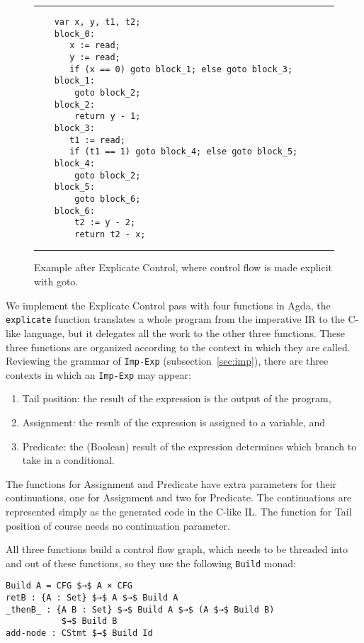 \documentclass[sigplan,review,dvipsnames,screen,10pt]{acmart}
\begin{document}
\begin{figure}[tp]
  \hrule
\begin{lstlisting}
    var x, y, t1, t2;
    block_0:
       x := read;
       y := read;
       if (x == 0) goto block_1; else goto block_3;
    block_1:
        goto block_2;
    block_2:
        return y - 1;
    block_3:
       t1 := read;
       if (t1 == 1) goto block_4; else goto block_5;
    block_4:
        goto block_2;
    block_5:
        goto block_6;
    block_6:
        t2 := y - 2;
        return t2 - x;
\end{lstlisting}
  \hrule
  \caption{Example after Explicate Control, where control flow
    is made explicit with goto.}
\label{fig:running-example-goto}
\end{figure}

We implement the Explicate Control pass with four functions in Agda,
the \lstinline{explicate} function translates a whole program from the
imperative IR to the C-like language, but it delegates all the work to
the other three functions. These three functions are organized
according to the context in which they are called. Reviewing the
grammar of \lstinline{Imp-Exp} (subsection~\ref{sec:imp}), there are
three contexts in which an \lstinline{Imp-Exp} may appear:
\begin{enumerate}
\item Tail position: the result of the expression is the output of the program,
\item Assignment: the result of the expression is assigned to a variable, and
\item Predicate: the (Boolean) result of the expression determines which
    branch to take in a conditional.
\end{enumerate}

The functions for Assignment and Predicate have extra parameters for
their continuations, one for Assignment and two for Predicate. The
continuations are represented simply as the generated code in the
C-like IL. The function for Tail position of course needs no
continuation parameter.

All three functions build a control flow graph, which needs to be
threaded into and out of these functions, so they use the following
\lstinline{Build} monad:

\begin{lstlisting}
Build A = CFG $→$ A × CFG
retB : {A : Set} $→$ A $→$ Build A
_thenB_ : {A B : Set} $→$ Build A $→$ (A $→$ Build B)
           $→$ Build B
add-node : CStmt $→$ Build Id
\end{lstlisting}
\end{document}
